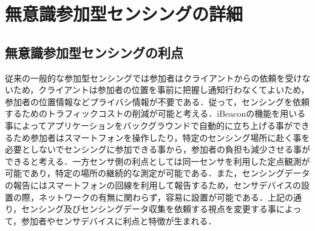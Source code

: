 \documentclass[submit,techrep]{ipsj}
\begin{document}


\section{無意識参加型センシングの詳細}


\subsection{無意識参加型センシングの利点}
従来の一般的な参加型センシングでは参加者はクライアントからの依頼を受けないため，クライアントは参加者の位置を事前に把握し通知行わなくてよいため，参加者の位置情報などプライバシ情報が不要である．従って，センシングを依頼するためのトラフィックコストの削減が可能と考える．iBeaconの機能を用いる事によってアプリケーションをバックグラウンドで自動的に立ち上げる事ができるため参加者はスマートフォンを操作したり，特定のセンシング場所に赴く事を必要としないでセンシングに参加できる事から，参加者の負担も減少させる事ができると考える．一方センサ側の利点としては同一センサを利用した定点観測が可能であり，特定の場所の継続的な測定が可能である．また，センシングデータの報告にはスマートフォンの回線を利用して報告するため，センサデバイスの設置の際，ネットワークの有無に関わらず，容易に設置が可能である．上記の通り，センシング及びセンシングデータ収集を依頼する視点を変更する事によって，参加者やセンサデバイスに利点と特徴が生まれる．
\end{document}
